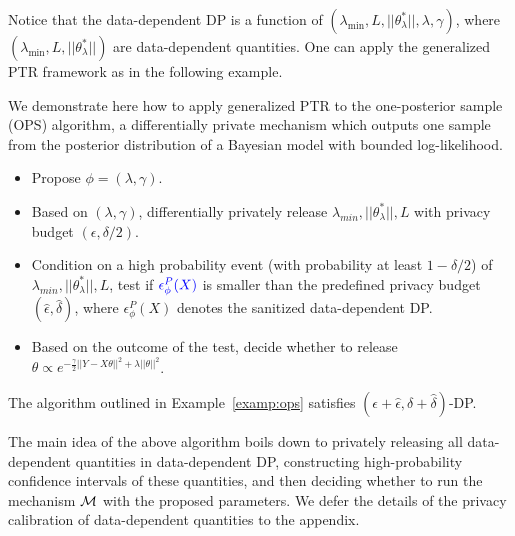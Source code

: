Notice that the data-dependent DP is a function of $(\lambda_{\min}, L, ||\theta_\lambda^*||, \lambda, \gamma)$, where $(\lambda_{\min}, L, ||\theta_\lambda^*||)$ are data-dependent quantities. One can apply the generalized PTR framework as in the following example.
\begin{example} We demonstrate here how to apply generalized PTR to the one-posterior sample (OPS) algorithm, a differentially private mechanism which outputs one sample from the posterior distribution of a Bayesian model with bounded log-likelihood.
\label{examp:ops}
\begin{itemize}
    \item Propose $\phi=(\lambda, \gamma)$.    %
    \item Based on $(\lambda, \gamma)$, differentially privately release $\lambda_{min}, ||\theta_\lambda^*||, L$ 
    with privacy budget $(\epsilon, \delta/2)$.    %
    \item Condition on a high probability event (with probability at least $1-\delta/2$) of $\lambda_{min}, ||\theta_\lambda^*||, L$, test if $\textcolor{blue}{\epsilon_{\phi}^P(X)}$  is smaller than the predefined privacy budget $(\hat{\epsilon}, \hat{\delta})$, where $\epsilon_\phi^P(X)$ denotes the sanitized data-dependent DP.   %
    \item Based on the outcome of the test, decide whether to release $\theta \propto e^{-\frac{\gamma}{2}||Y-X\theta||^2 + \lambda||\theta||^2}$.   %
\end{itemize}
\begin{theorem}
The algorithm outlined in Example~\ref{examp:ops} satisfies $(\epsilon+ \hat{\epsilon}, \delta + \hat{\delta})$-DP. 
\end{theorem}
\end{example}

The main idea of the above algorithm boils down to  privately releasing all data-dependent quantities in data-dependent DP, constructing high-probability confidence intervals of these quantities, and then deciding whether to run the mechanism $\mathcal{M}$ with the proposed parameters. We defer the details of the privacy calibration of data-dependent quantities to the appendix. 


